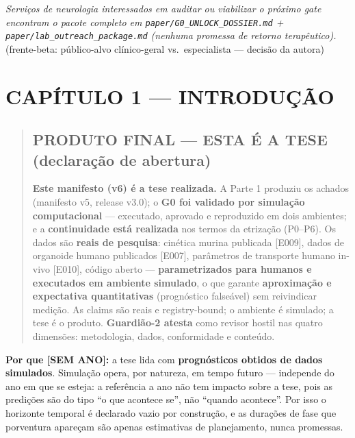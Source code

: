 \documentclass[
  12pt,
]{report}
\begin{document}
\emph{Serviços de neurologia interessados em auditar ou viabilizar o
próximo gate encontram o pacote completo em
\texttt{paper/G0\_UNLOCK\_DOSSIER.md} +
\texttt{paper/lab\_outreach\_package.md} (nenhuma promessa de retorno
terapêutico).}(frente-beta: público-alvo clínico-geral vs.~especialista
--- decisão da autora)

\hypertarget{capuxedtulo-1-introduuxe7uxe3o}{%
\chapter{CAPÍTULO 1 ---
INTRODUÇÃO}\label{capuxedtulo-1-introduuxe7uxe3o}}

\begin{quote}
\hypertarget{produto-final-esta-uxe9-a-tese-declarauxe7uxe3o-de-abertura}{%
\section{PRODUTO FINAL --- ESTA É A TESE (declaração de
abertura)}\label{produto-final-esta-uxe9-a-tese-declarauxe7uxe3o-de-abertura}}

\textbf{Este manifesto (v6) é a tese realizada.} A Parte 1 produziu os
achados (manifesto v5, release v3.0); o \textbf{G0 foi validado por
simulação computacional} --- executado, aprovado e reproduzido em dois
ambientes; e a \textbf{continuidade está realizada} nos termos da
etrização (P0--P6). Os dados são \textbf{reais de pesquisa}: cinética
murina publicada {[}E009{]}, dados de organoide humano publicados
{[}E007{]}, parâmetros de transporte humano in-vivo {[}E010{]}, código
aberto --- \textbf{parametrizados para humanos e executados em ambiente
simulado}, o que garante \textbf{aproximação e expectativa
quantitativas} (prognóstico falseável) sem reivindicar medição. As
claims são reais e registry-bound; o ambiente é simulado; a tese é o
produto. \textbf{Guardião-2 atesta} como revisor hostil nas quatro
dimensões: metodologia, dados, conformidade e conteúdo.
\end{quote}

\textbf{Por que {[}SEM ANO{]}:} a tese lida com \textbf{prognósticos
obtidos de dados simulados}. Simulação opera, por natureza, em tempo
futuro --- independe do ano em que se esteja: a referência a ano não tem
impacto sobre a tese, pois as predições são do tipo ``o que acontece
se'', não ``quando acontece''. Por isso o horizonte temporal é declarado
vazio por construção, e as durações de fase que porventura apareçam são
apenas estimativas de planejamento, nunca promessas.
\end{document}
